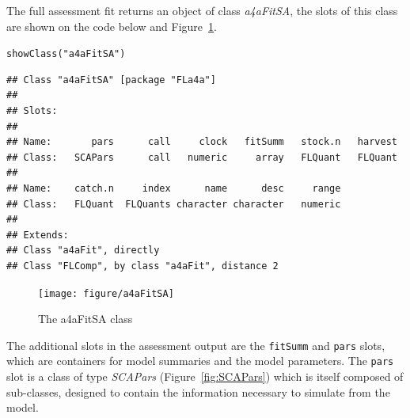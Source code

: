\documentclass[a4paper,english,10pt]{article}\usepackage[]{graphicx}\usepackage[]{color}
\makeatletter
\newcommand{\hlstr}[1]{\textcolor[rgb]{0.2,0.2,0.2}{#1}}%
\newcommand{\hlstd}[1]{\textcolor[rgb]{0,0,0}{#1}}%
\newcommand{\hlkwd}[1]{\textcolor[rgb]{0.361,0.506,0.596}{#1}}%
\newenvironment{kframe}{%
 \def\at@end@of@kframe{}%
 \ifinner\ifhmode%
  \def\at@end@of@kframe{\end{minipage}}%
  \begin{minipage}{\columnwidth}%
 \fi\fi%
 \def\FrameCommand##1{\hskip\@totalleftmargin \hskip-\fboxsep
 \colorbox{shadecolor}{##1}\hskip-\fboxsep
     \hskip-\linewidth \hskip-\@totalleftmargin \hskip\columnwidth}%
 \MakeFramed {\advance\hsize-\width
   \@totalleftmargin\z@ \linewidth\hsize
   \@setminipage}}%
 {\par\unskip\endMakeFramed%
 \at@end@of@kframe}
\newenvironment{knitrout}{}{} %
\newcommand{\code}[1]{{\texttt{#1}}}
\newcommand{\class}[1]{{\textit{#1}}}
\makeatother
\begin{document}
The full assessment fit returns an object of class \class{a4aFitSA}, the slots of this class are shown on the code below and Figure~\ref{fig:a4aFitSA}.

\begin{knitrout}
\color{fgcolor}\begin{kframe}
\begin{alltt}
\hlkwd{showClass}\hlstd{(}\hlstr{"a4aFitSA"}\hlstd{)}
\end{alltt}
\begin{verbatim}
## Class "a4aFitSA" [package "FLa4a"]
## 
## Slots:
##                                                                   
## Name:       pars      call     clock   fitSumm   stock.n   harvest
## Class:   SCAPars      call   numeric     array   FLQuant   FLQuant
##                                                         
## Name:    catch.n     index      name      desc     range
## Class:   FLQuant  FLQuants character character   numeric
## 
## Extends: 
## Class "a4aFit", directly
## Class "FLComp", by class "a4aFit", distance 2
\end{verbatim}
\end{kframe}
\end{knitrout}

\begin{knitrout}
\color{fgcolor}\begin{figure}[H]


{\centering \texttt{[image: figure/a4aFitSA]} 

}

\caption[The a4aFitSA class]{The a4aFitSA class\label{fig:a4aFitSA}}
\end{figure}


\end{knitrout}

The additional slots in the assessment output are the \code{fitSumm} and \code{pars} slots, which are containers for model summaries and the model parameters. The \code{pars} slot is a class of type \class{SCAPars} (Figure~\ref{fig:SCAPars}) which is itself composed of sub-classes, designed to contain the information necessary to simulate from the model.
\end{document}
